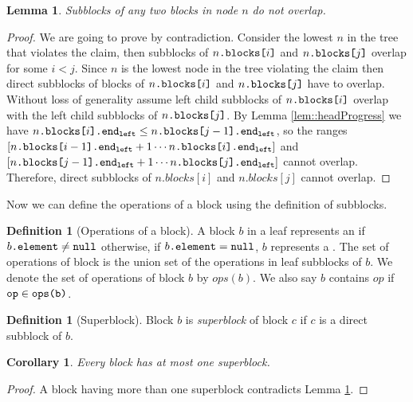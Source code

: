 \documentclass[10pt]{article}
\newcommand{\sub}[1]{\textsubscript{#1}}
\renewcommand{\it}[1]{\textit{#1}}
\newcommand{\nf}[1]{{\normalfont{\texttt{#1}}}}
\newtheorem{lemma}[theorem]{Lemma}
\newtheorem{corollary}[theorem]{Corollary}
\theoremstyle{definition}
\newtheorem{definition}[theorem]{Definition}
\begin{document}
\begin{lemma} \label{lem::subblocksDistinct}
Subblocks of any two blocks in node $n$ do not overlap.  
\end{lemma}
\begin{proof}
We are going to prove by contradiction. Consider the lowest \nf{node} $n$ in the tree that violates the claim, then subblocks of $n\nf{.blocks[}i\nf{]}$ and $n\nf{.blocks[}j\nf{]}$ overlap for some $i<j$. Since $n$ is the lowest node in the tree violating the claim then direct subblocks of blocks of $n\nf{.blocks[}i\nf{]}$ and $n\nf{.blocks[}j\nf{]}$ have to overlap. Without loss of generality assume left child subblocks of $n\nf{.blocks[}i\nf{]}$ overlap with the left child subblocks of $n\nf{.blocks[}j\nf{]}$. By Lemma \ref{lem::headProgress} we have $ \nf{$n$.blocks[$i$].end\sub{left}} \leq \nf{$n$.blocks[$j-1$].end\sub{left}}$, so the ranges $[\nf{$n$.blocks[$i-1$].end\sub{left}}+1 \cdots \nf{$n$.blocks[$i$].end\sub{left}}]$ and $[\nf{$n$.blocks[$j-1$].end\sub{left}}+1 \cdots \nf{$n$.blocks[$j$].end\sub{left}}]$ cannot overlap. Therefore, direct subblocks of $n.blocks[i]$ and $n.blocks[j]$ cannot overlap.
\end{proof}

Now we can define the operations of a block using the definition of subblocks.
\begin{definition}[Operations of a block]\label{def::ops}
A block $b$ in a leaf represents an \nf{Enqueue()} if $b\nf{.element}\neq\nf{null}$ otherwise, if $b\nf{.element}=\nf{null}$, $b$ represents a \nf{Dequeue()}. The set of operations of block \nf{b} is the union set of the operations in leaf subblocks of $b$. We denote the set of operations of block $b$ by ${ops(b)}$.  We also say ${b}$ contains ${op}$ if $\nf{op}\in\nf{ops(b)}$.
\end{definition}

\begin{definition}[Superblock]
  Block $b$ is \it{superblock} of block $c$ if $c$ is a direct subblock of $b$.
\end{definition}
\begin{corollary}
Every block has at most one superblock.
\end{corollary}
\begin{proof}
A block having more than one superblock contradicts Lemma \ref{lem::subblocksDistinct}.
\end{proof}
\end{document}
